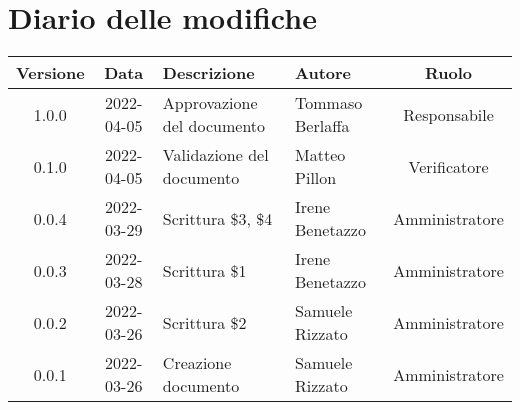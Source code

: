 \section*{Diario delle modifiche}
	\begin{center}
	\renewcommand{\arraystretch}{1.8} %
	\begin{tabular}{ |c|c|m{12em}|m{7em}|c| }
	\hline
	\textbf{Versione} & \textbf{Data} & \textbf{Descrizione} &  \textbf{Autore} &  \textbf{Ruolo} \\ %
	\hline 
	1.0.0 & 2022-04-05 & Approvazione del  \newline documento & Tommaso Berlaffa & Responsabile \\
	\hline 
	0.1.0 & 2022-04-05 & Validazione del documento & Matteo Pillon & Verificatore\\
	\hline
	0.0.4 & 2022-03-29 & Scrittura \$3, \$4 & Irene Benetazzo & Amministratore\\
	\hline
    0.0.3 & 2022-03-28 & Scrittura \$1 & Irene Benetazzo & Amministratore\\
	\hline
    0.0.2 & 2022-03-26 & Scrittura \$2 & Samuele \newline Rizzato & Amministratore\\
	\hline
    0.0.1 & 2022-03-26 & Creazione documento & Samuele \newline Rizzato & Amministratore\\
	\hline
	\end{tabular}
	\end{center}
	\newpage